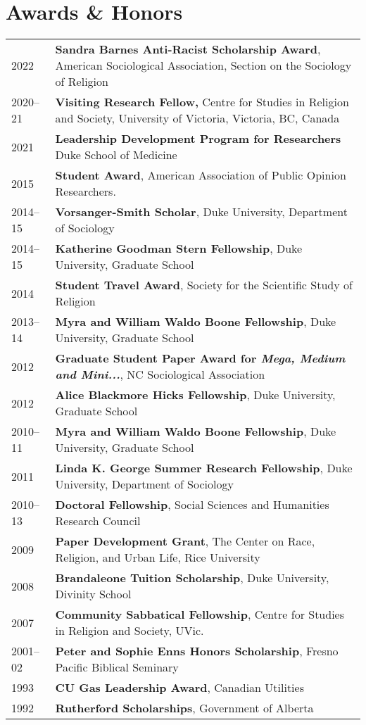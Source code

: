 \section*{Awards \& Honors}

\begin{longtable}{p{} p{}}
2022  & \textbf{Sandra Barnes Anti-Racist Scholarship Award}, American Sociological Association, Section on the Sociology of Religion\\
2020--21 & \textbf{Visiting Research Fellow,} Centre for Studies in Religion and Society, University of Victoria, Victoria, BC, Canada \\
2021 & \textbf{Leadership Development Program for Researchers} Duke School of Medicine\\
2015 & \textbf{Student Award}, American Association of Public Opinion Researchers.\\
2014--15 & \textbf{Vorsanger-Smith Scholar}, Duke University, Department of Sociology\\
2014--15 & \textbf{Katherine Goodman Stern Fellowship}, Duke University, Graduate School\\
2014 & \textbf{Student Travel Award}, Society for the Scientific Study of Religion\\
2013--14 & \textbf{Myra and William Waldo Boone Fellowship}, Duke University, Graduate School\\
2012 & \textbf{Graduate Student Paper Award for \emph{Mega, Medium and Mini...}}, NC Sociological Association\\
2012 & \textbf{Alice Blackmore Hicks Fellowship}, Duke University, Graduate School\\
2010--11 & \textbf{Myra and William Waldo Boone Fellowship}, Duke University, Graduate School\\
2011 & \textbf{Linda K. George Summer Research Fellowship}, Duke University, Department of Sociology\\
2010--13 & \textbf{Doctoral Fellowship}, Social Sciences and Humanities Research Council\\
2009 & \textbf{Paper Development Grant}, The Center on Race, Religion, and Urban Life, Rice University\\
2008 & \textbf{Brandaleone Tuition Scholarship}, Duke University, Divinity School\\
2007 & \textbf{Community Sabbatical Fellowship}, Centre for Studies in Religion and Society, UVic.\\
2001--02 & \textbf{Peter and Sophie Enns Honors Scholarship}, Fresno Pacific Biblical Seminary\\
1993 & \textbf{CU Gas Leadership Award}, Canadian Utilities\\
1992 & \textbf{Rutherford Scholarships}, Government of Alberta\\
\end{longtable}
